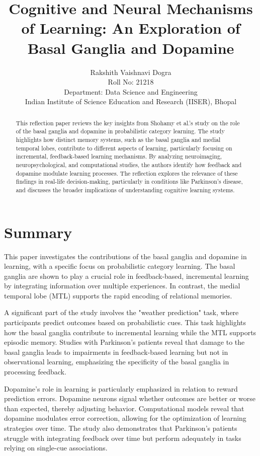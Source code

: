\documentclass[12pt]{article}
\title{\textbf{Cognitive and Neural Mechanisms of Learning: An Exploration of Basal Ganglia and Dopamine}}
\author{Rakshith Vaishnavi Dogra\\Roll No: 21218 \\Department: Data Science and Engineering \\Indian Institute of Science Education and Research (IISER), Bhopal}
\date{}
\begin{document}
\maketitle

\begin{abstract}
\noindent This reflection paper reviews the key insights from Shohamy et al.'s study on the role of the basal ganglia and dopamine in probabilistic category learning. The study highlights how distinct memory systems, such as the basal ganglia and medial temporal lobes, contribute to different aspects of learning, particularly focusing on incremental, feedback-based learning mechanisms. By analyzing neuroimaging, neuropsychological, and computational studies, the authors identify how feedback and dopamine modulate learning processes. The reflection explores the relevance of these findings in real-life decision-making, particularly in conditions like Parkinson's disease, and discusses the broader implications of understanding cognitive learning systems.
\end{abstract}

\newpage

\onehalfspacing

\section*{Summary}
This paper investigates the contributions of the basal ganglia and dopamine in learning, with a specific focus on probabilistic category learning. The basal ganglia are shown to play a crucial role in feedback-based, incremental learning by integrating information over multiple experiences. In contrast, the medial temporal lobe (MTL) supports the rapid encoding of relational memories. 

A significant part of the study involves the "weather prediction" task, where participants predict outcomes based on probabilistic cues. This task highlights how the basal ganglia contribute to incremental learning while the MTL supports episodic memory. Studies with Parkinson's patients reveal that damage to the basal ganglia leads to impairments in feedback-based learning but not in observational learning, emphasizing the specificity of the basal ganglia in processing feedback.

Dopamine's role in learning is particularly emphasized in relation to reward prediction errors. Dopamine neurons signal whether outcomes are better or worse than expected, thereby adjusting behavior. Computational models reveal that dopamine modulates error correction, allowing for the optimization of learning strategies over time. The study also demonstrates that Parkinson's patients struggle with integrating feedback over time but perform adequately in tasks relying on single-cue associations.
\end{document}

